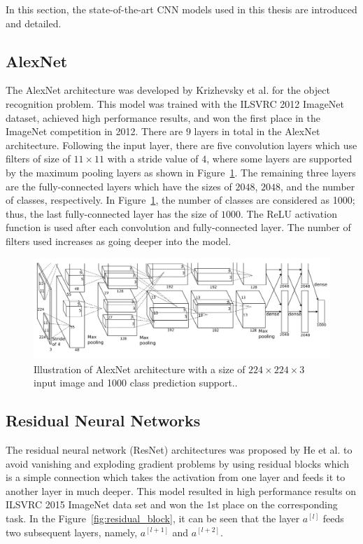 In this section, the state-of-the-art CNN models used in this thesis are introduced and detailed.

\subsection{AlexNet}

The AlexNet architecture was developed by Krizhevsky et al. \cite{AlexNet} for the object recognition problem. This model was trained with the ILSVRC 2012 ImageNet \cite{imagenet} dataset, achieved high performance results, and won the first place in the ImageNet competition in 2012. There are $9$ layers in total in the AlexNet architecture. Following the input layer, there are five convolution layers which use filters of size of $11 \times 11$ with a stride value of $4$, where some layers are supported by the maximum pooling layers as shown in Figure~\ref{fig:alexnet_arch}. The remaining three layers are the fully-connected layers which have the sizes of $2048$, $2048$, and the number of classes, respectively. In Figure~\ref{fig:alexnet_arch}, the number of classes are considered as 1000; thus, the last fully-connected layer has the size of $1000$.  The ReLU activation function is used after each convolution and fully-connected layer. The number of filters used increases as going deeper into the model.

\begin{figure}[h]
	\centering
	\includegraphics[width=\linewidth]{fig/alexnet_arch.png}
	\caption{Illustration of AlexNet architecture with a size of $224 \times 224 \times 3$ input image and 1000 class prediction support.\cite{AlexNet}.}
	\label{fig:alexnet_arch}
\end{figure}

\subsection{Residual Neural Networks}

The residual neural network (ResNet) architectures was proposed by He et al. \cite{ResNet} to avoid vanishing and exploding gradient problems by using residual blocks which is a simple connection which takes the activation from one layer and feeds it to another layer in much deeper. This model resulted in high performance results on ILSVRC 2015 ImageNet \cite{imagenet} data set and won the 1st place on the corresponding task. In the Figure~\ref{fig:residual_block}, it can be seen that the layer $a^{[l]}$ feeds two subsequent layers, namely, $a^{[l+1]}$ and $a^{[l+2]}$.

